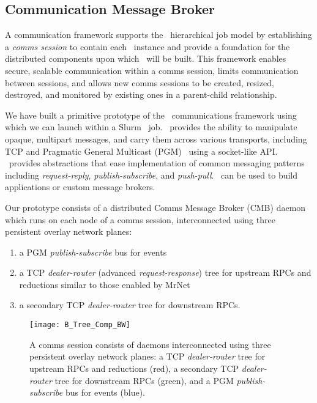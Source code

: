 \subsection{Communication Message Broker}

A communication framework supports the \flux\ hierarchical job model
by establishing a {\em comms session} to contain each \flux\ instance
and provide a foundation for the distributed components upon which
\flux\ will be built.
This framework enables secure, scalable communication
within a comms session, limits communication between sessions,
and allows new comms sessions to be created, resized, destroyed,
and monitored by existing ones in a parent-child relationship.

We have built a primitive prototype of the \flux\ communications framework
using \zMQ~\cite{ZMQGuide} which we can launch within a
Slurm~\cite{Jette02slurm} job.
\zMQ\ provides the ability to manipulate opaque,
multipart messages, and carry them across various transports, including
TCP and Pragmatic General Multicast (PGM)~\cite{rfc3208}
using a socket-like API.
\zMQ\ provides abstractions that ease implementation of common
messaging patterns including {\em request-reply}, {\em publish-subscribe},
and {\em push-pull}.
\zMQ\ can be used to build applications or custom message brokers.

Our prototype consists of a distributed Comms Message Broker (CMB)
daemon which runs on each node of a comms session, interconnected using
three persistent overlay network planes:
\begin{enumerate}
\item{a PGM {\em publish-subscribe} bus for events}
\item{a TCP {\em dealer-router} (advanced {\em request-response})
tree for upstream RPCs and reductions
similar to those enabled by MrNet~\cite{mrnet}}
\item{a secondary TCP {\em dealer-router} tree for downstream RPCs.}
\end{enumerate}

\begin{figure}
\centering
\texttt{[image: B\_Tree\_Comp\_BW]}
\caption{A comms session consists of daemons interconnected using
three persistent overlay network planes:
a TCP {\em dealer-router} tree for upstream RPCs and reductions (red),
a secondary TCP {\em dealer-router} tree for downstream RPCs (green), and
a PGM {\em publish-subscribe} bus for events (blue).}
\label{fig:commswireup}
\end{figure}

